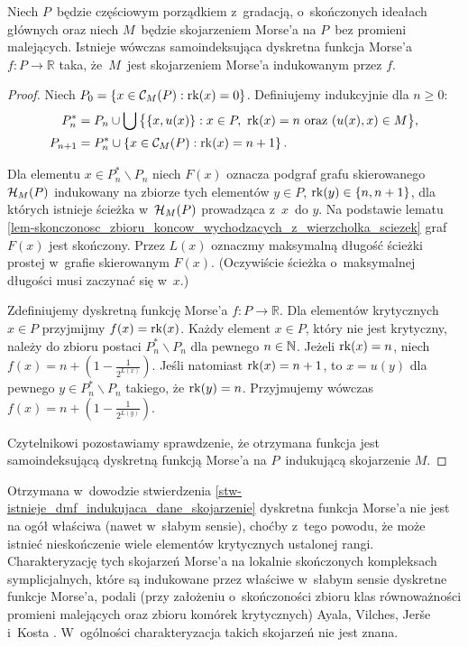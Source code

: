 \begin{stw}\label{stw-istnieje_dmf_indukujaca_dane_skojarzenie}
Niech $P$~będzie częściowym porządkiem z~gradacją, o~skończonych ideałach głównych oraz niech $M$~będzie skojarzeniem Morse'a na $P$~bez promieni malejących. Istnieje wówczas samoindeksująca dyskretna funkcja Morse'a $f\colon P\to \mathbb{R}$ taka, że~$M$~jest skojarzeniem Morse'a indukowanym przez $f$.
\end{stw}
\begin{proof}
Niech $P_0=\left\{x\in \mathcal{C}_M(P):\operatorname{rk}(x)=0\right\}$. Definiujemy indukcyjnie dla $n\geq 0$: \begin{align*}P_n^*&=P_n\cup \bigcup\big\{\{x,u(x)\}: x\in P,\ \operatorname{rk}(x)=n \text{ oraz } (u(x),x)\in M\big\},\\
P_{n+1}&=P_n^*\cup\left\{x\in \mathcal{C}_M(P):\operatorname{rk}(x)=n+1\right\}.\end{align*}

Dla elementu $x\in P^*_n\smallsetminus P_n$ niech $F(x)$ oznacza podgraf grafu skierowanego $\mathcal{H}_M(P)$ indukowany na zbiorze tych elementów $y\in P$, $\operatorname{rk}(y)\in\{n,n+1\}$, dla których istnieje ścieżka w~$\mathcal{H}_M(P)$ prowadząca z~$x$~do $y$. Na podstawie lematu \ref{lem-skonczonosc_zbioru_koncow_wychodzacych_z_wierzcholka_sciezek} graf $F(x)$ jest skończony. Przez $L(x)$ oznaczmy maksymalną długość ścieżki prostej w~grafie skierowanym $F(x)$. (Oczywiście ścieżka o~maksymalnej długości musi zaczynać się w~$x$.)

Zdefiniujemy dyskretną funkcję Morse'a $f\colon P\to \mathbb{R}$. Dla elementów krytycznych $x\in P$ przyjmijmy $f(x)=\operatorname{rk}(x)$. Każdy element $x\in P$, który nie jest krytyczny, należy do zbioru postaci $P^*_n\smallsetminus P_n$ dla pewnego $n\in\mathbb{N}$. Jeżeli $\operatorname{rk}(x)=n$, niech $f(x)=n+\left(1-\frac{1}{2^{L(x)}}\right)$. Jeśli natomiast $\operatorname{rk}(x)=n+1$, to $x=u(y)$ dla pewnego $y\in P^*_n\smallsetminus P_n$ takiego, że $\operatorname{rk}(y)=n$. Przyjmujemy wówczas $f(x)=n+\left(1-\frac{1}{2^{L(y)}}\right)$.

Czytelnikowi pozostawiamy sprawdzenie, że otrzymana funkcja jest samoindeksującą dyskretną funkcją Morse'a na $P$~indukującą skojarzenie $M$.
\end{proof}

Otrzymana w~dowodzie stwierdzenia \ref{stw-istnieje_dmf_indukujaca_dane_skojarzenie} dyskretna funkcja Morse'a nie jest na ogół właściwa (nawet w~słabym sensie), choćby z~tego powodu, że może istnieć nieskończenie wiele elementów krytycznych ustalonej rangi. Charakteryzację tych skojarzeń Morse'a na lokalnie skończonych kompleksach symplicjalnych, które są indukowane przez właściwe w~słabym sensie dyskretne funkcje Morse'a, podali (przy założeniu o~skończoności zbioru klas równoważności promieni malejących oraz zbioru komórek krytycznych) Ayala, Vilches, Jer{\v{s}}e i~Kosta \cite{Ayala11}. W~ogólności charakteryzacja takich skojarzeń nie jest znana.

